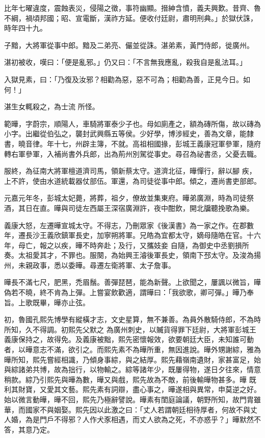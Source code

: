 \begin{pinyinscope}
 比年七曜違度，震蝕表災，侵陽之徵，事符幽顯。搢紳含憤，義夫興歎。昔齊、魯不綱，禍頃邦國；昭、宣電斷，漢祚方延。便收付廷尉，肅明刑典。」於獄伏誅，時年四十九。



 子黯，大將軍從事中郎。黯及二弟亮、儼並從誅。湛弟素，黃門侍郎，徙廣州。



 湛初被收，嘆曰：「便是亂邪。」仍又曰：「不言無我應亂，殺我自是亂法耳。」



 入獄見素，曰：「乃復及汝邪？相勸為惡，惡不可為；相勸為善，正見今日。如何！」



 湛生女輒殺之，為士流
 所怪。



 範曄，字蔚宗，順陽人，車騎將軍泰少子也。母如廁產之，額為磚所傷，故以磚為小字。出繼從伯弘之，襲封武興縣五等侯。少好學，博涉經史，善為文章，能隸書，曉音律。年十七，州辟主簿，不就。高祖相國掾，彭城王義康冠軍參軍，隨府轉右軍參軍，入補尚書外兵郎，出為荊州別駕從事史。尋召為祕書丞，父憂去職。



 服終，為征南大將軍檀道濟司馬，領新蔡太守。道濟北征，曄憚行，辭以腳
 疾，上不許，使由水道統載器仗部伍。軍還，為司徒從事中郎。傾之，遷尚書吏部郎。



 元嘉元年冬，彭城太妃薨，將葬，祖夕，僚故並集東府。曄弟廣淵，時為司徒祭酒，其日在直。曄與司徒左西屬王深宿廣淵許，夜中酣飲，開北牖聽挽歌為樂。



 義康大怒，左遷曄宣城太守。不得志，乃刪眾家《後漢書》為一家之作。在郡數年，遷長沙王義欣鎮軍長史，加寧朔將軍。兄皓為宜都太守，嫡母隨皓在官。十六年，母亡，報之以疾，曄不時奔赴；及行，又攜妓妾
 自隨，為御史中丞劉損所奏。太祖愛其才，不罪也。服闋，為始興王濬後軍長史，領南下邳太守。及浚為揚州，未親政事，悉以委曄。尋遷左衛將軍、太子詹事。



 曄長不滿七尺，肥黑，禿眉鬚。善彈琵琶，能為新聲。上欲聞之，屢諷以微旨，曄偽若不曉，終不肯為上彈。上嘗宴飲歡適，謂曄曰：「我欲歌，卿可彈。」曄乃奉旨。上歌既畢，曄亦止弦。



 初，魯國孔熙先博學有縱橫才志，文史星算，無不兼善。為員外散騎侍郎，不為時所知，久不得調。初熙先父默之
 為廣州刺史，以贓貨得罪下廷尉，大將軍彭城王義康保持之，故得免。及義康被黜，熙先密懷報效，欲要朝廷大臣，未知誰可動者，以曄意志不滿，欲引之。而熙先素不為曄所重，無因進說。曄外甥謝綜，雅為曄所知，熙先嘗經相識，乃傾身事綜，與之結厚。熙先藉嶺南遺財，家甚富足，始與綜諸弟共博，故為拙行，以物輸之。綜等諸年少，既屢得物，遂日夕往來，情意稍款。綜乃引熙先與曄為數，曄又與戲，熙先故為不敵，前後輸曄物甚多。曄
 既利其財寶，又愛其文藝。熙先素有詞辯，盡心事之，曄遂相與異常，申莫逆之好。始以微言動曄，曄不回，熙先乃極辭譬說。曄素有閨庭論議，朝野所知，故門胄雖華，而國家不與姻娶。熙先因以此激之曰：「丈人若謂朝廷相待厚者，何故不與丈人婚，為是門戶不得邪？人作犬豕相遇，而丈人欲為之死，不亦惑乎？」曄默然不答，其意乃定。




\end{pinyinscope}
